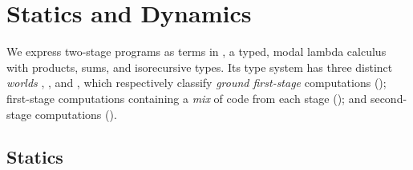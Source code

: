 
\section{\texorpdfstring{\lang}{λ12} Statics and Dynamics}
\label{sec:semantics}









We express two-stage programs as terms in \lang, a typed, modal lambda calculus
with products, sums, and isorecursive types. Its type system has three distinct
\emph{worlds} \bbonep, \bbonem, and \bbtwo, which respectively classify
\emph{ground first-stage} computations (\bbonep); 
first-stage computations containing a \emph{mix} of code from each stage
(\bbonem); 
and second-stage computations (\bbtwo).

\subsection{Statics}



